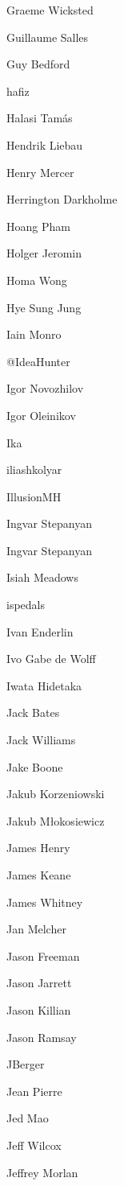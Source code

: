 \begin{DoxyItemize}
\item Graeme Wicksted
\item Guillaume Salles
\item Guy Bedford
\item hafiz
\item Halasi Tamás
\item Hendrik Liebau
\item Henry Mercer
\item Herrington Darkholme
\item Hoang Pham
\item Holger Jeromin
\item Homa Wong
\item Hye Sung Jung
\item Iain Monro
\item @\+Idea\+Hunter
\item Igor Novozhilov
\item Igor Oleinikov
\item Ika
\item iliashkolyar
\item Illusion\+MH
\item Ingvar Stepanyan
\item Ingvar Stepanyan
\item Isiah Meadows
\item ispedals
\item Ivan Enderlin
\item Ivo Gabe de Wolff
\item Iwata Hidetaka
\item Jack Bates
\item Jack Williams
\item Jake Boone
\item Jakub Korzeniowski
\item Jakub Młokosiewicz
\item James Henry
\item James Keane
\item James Whitney
\item Jan Melcher
\item Jason Freeman
\item Jason Jarrett
\item Jason Killian
\item Jason Ramsay
\item JBerger
\item Jean Pierre
\item Jed Mao
\item Jeff Wilcox
\item Jeffrey Morlan

\end{DoxyItemize}
